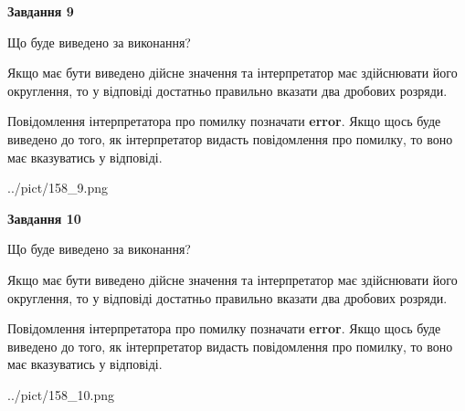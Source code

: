 \documentclass[12pt, ukrainian]{article}
\begin{document}
{\begin {Large}
{\begin {center}\textbf{Завдання 9}\end {center}}\par
Що буде виведено за виконання? \par

Якщо має бути виведено дійсне значення та інтерпретатор має здійснювати його округлення, 
то у відповіді достатньо правильно вказати два дробових розряди.

Повідомлення інтерпретатора про помилку позначати \textbf{error}.
Якщо щось буде виведено до того, як інтерпретатор видасть повідомлення про помилку, 
то воно має вказуватись у відповіді. \par

\begin{center}
	{../pict/158_9.png}
\end{center}
\newpage

{\begin {center}\textbf{Завдання 10}\end {center}}\par
Що буде виведено за виконання? \par

Якщо має бути виведено дійсне значення та інтерпретатор має здійснювати його округлення, 
то у відповіді достатньо правильно вказати два дробових розряди.

Повідомлення інтерпретатора про помилку позначати \textbf{error}.
Якщо щось буде виведено до того, як інтерпретатор видасть повідомлення про помилку, 
то воно має вказуватись у відповіді. \par

\begin{center}
	{../pict/158_10.png}
\end{center}
\newpage

\end {Large}}
\end{document}
